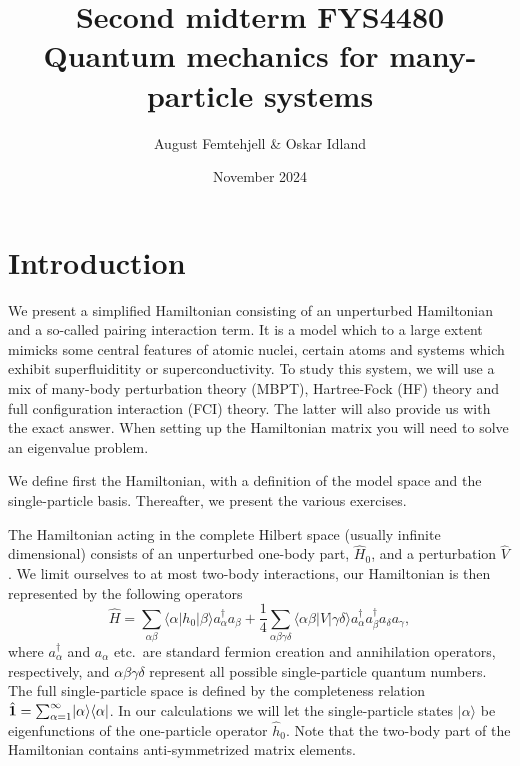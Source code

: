 \documentclass{article}
\title{
    Second midterm FYS4480\\
    Quantum mechanics for many-particle systems
}
\author{August Femtehjell \& Oskar Idland}
\date{November 2024}
\begin{document}
\maketitle

\section*{Introduction}
We present a simplified Hamiltonian consisting of an unperturbed Hamiltonian and a so-called pairing interaction term.
It is a model which to a large extent mimicks some central features of atomic nuclei, certain atoms and systems which exhibit superfluiditity or superconductivity.
To study this system, we will use a mix of many-body perturbation theory (MBPT), Hartree-Fock (HF) theory and full configuration interaction (FCI) theory.
The latter will also provide us with the exact answer.
When setting up the Hamiltonian matrix you will need to solve an eigenvalue problem.

We define first the Hamiltonian, with a definition of the model space and the single-particle basis.
Thereafter, we present the various exercises.

The Hamiltonian acting in the complete Hilbert space (usually infinite dimensional) consists of an unperturbed one-body part, $\hat{H}_0$, and a perturbation $\hat{V}$.
We limit ourselves to at most two-body interactions, our Hamiltonian is then represented by the following operators
\begin{equation*}
    \hat{H} = \sum_{\alpha\beta} \langle \alpha \lvert h_0 \rvert \beta \rangle a_{\alpha}^{\dagger} a_{\beta}
    + \frac{1}{4} \sum_{\alpha\beta\gamma\delta} \langle
    \alpha \beta \lvert V \rvert \gamma\delta
    \rangle
    a_{\alpha}^{\dagger} a_{\beta}^{\dagger} a_{\delta} a_{\gamma},
\end{equation*}
where $a_{\alpha}^{\dagger}$ and $a_{\alpha}$ etc.~are standard fermion creation and annihilation operators, respectively, and
$\alpha\beta\gamma\delta$ represent all possible single-particle quantum numbers.
The full single-particle space is defined by the completeness relation $\hat{{\bf 1}} = \sum_{\alpha
= 1}^{\infty} \lvert \alpha \rangle \langle \alpha \rvert$.
In our calculations we will let the single-particle states $\lvert \alpha \rangle$ be eigenfunctions of the one-particle operator $\hat{h}_0$.
Note that the two-body part of the Hamiltonian contains anti-symmetrized matrix elements.
\end{document}
